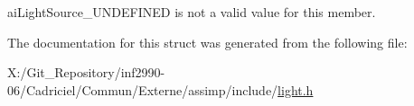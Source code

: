 ai\-Light\-Source\-\_\-\-U\-N\-D\-E\-F\-I\-N\-E\-D is not a valid value for this member. 

The documentation for this struct was generated from the following file\-:\begin{DoxyCompactItemize}
\item 
X\-:/\-Git\-\_\-\-Repository/inf2990-\/06/\-Cadriciel/\-Commun/\-Externe/assimp/include/\hyperlink{light_8h}{light.\-h}\end{DoxyCompactItemize}
